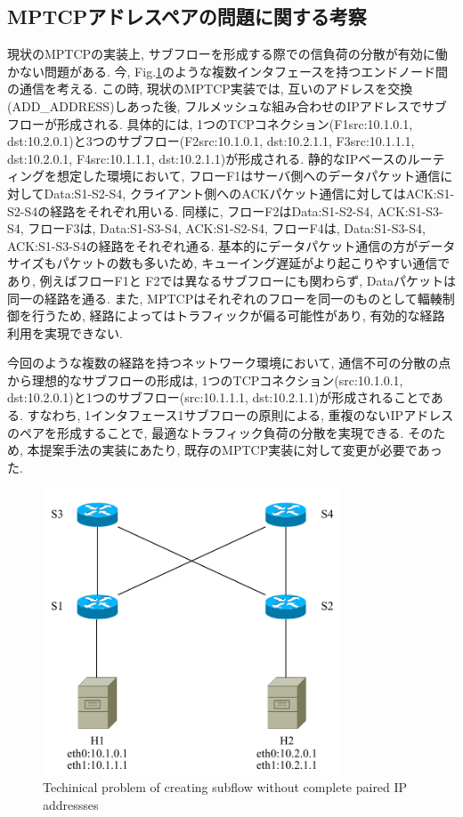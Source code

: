 \subsection{MPTCPアドレスペアの問題に関する考察}
現状のMPTCPの実装上, サブフローを形成する際での信負荷の分散が有効に働かない問題がある. 
今, Fig.\ref{fig:mptcp_pair}のような複数インタフェースを持つエンドノード間の通信を考える. 
この時, 現状のMPTCP実装では, 互いのアドレスを交換(ADD\_ADDRESS)しあった後,
フルメッシュな組み合わせのIPアドレスでサブフローが形成される. 
具体的には, 1つのTCPコネクション(F1{src:10.1.0.1, dst:10.2.0.1})と3つのサブフロー(F2{src:10.1.0.1,
dst:10.2.1.1}, F3{src:10.1.1.1, dst:10.2.0.1}, F4{src:10.1.1.1,
dst:10.2.1.1})が形成される. 
静的なIPベースのルーティングを想定した環境において, フローF1はサーバ側へのデータパケット通信に対してData:S1-S2-S4,
クライアント側へのACKパケット通信に対してはACK:S1-S2-S4の経路をそれぞれ用いる. 
同様に, フローF2はData:S1-S2-S4, ACK:S1-S3-S4, フローF3は, Data:S1-S3-S4,
ACK:S1-S2-S4, フローF4は, Data:S1-S3-S4, ACK:S1-S3-S4の経路をそれぞれ通る. 
基本的にデータパケット通信の方がデータサイズもパケットの数も多いため, キューイング遅延がより起こりやすい通信であり, 例えばフローF1と
F2では異なるサブフローにも関わらず, Dataパケットは同一の経路を通る. 
また, MPTCPはそれぞれのフローを同一のものとして輻輳制御を行うため, 経路によってはトラフィックが偏る可能性があり, 有効的な経路利用を実現できない. 

今回のような複数の経路を持つネットワーク環境において, 通信不可の分散の点から理想的なサブフローの形成は,
1つのTCPコネクション({src:10.1.0.1, dst:10.2.0.1})と1つのサブフロー({src:10.1.1.1,
dst:10.2.1.1})が形成されることである. 
すなわち, 1インタフェース1サブフローの原則による, 重複のないIPアドレスのペアを形成することで, 最適なトラフィック負荷の分散を実現できる. 
そのため, 本提案手法の実装にあたり, 既存のMPTCP実装に対して変更が必要であった. 

\begin{figure}[t]
    \begin{center}
    \includegraphics[autoebb, width=250pt]{./img/pair_problem.pdf}
    \caption{Techinical problem of creating subflow without complete paired IP
    addressses}
    \label{fig:mptcp_pair}
    \end{center}
\end{figure}

